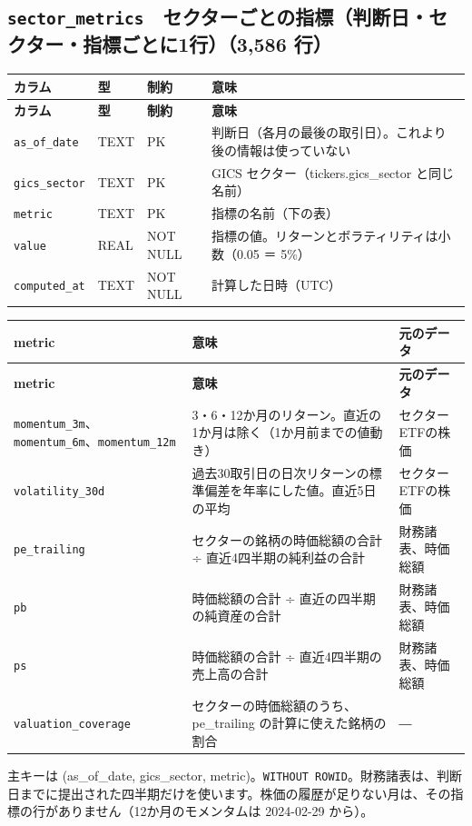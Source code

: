\documentclass[xelatex,ja=standard,jafont=hiragino-pron,a4paper,10pt]{bxjsreport}
\begin{document}
\subsection*{\texttt{sector\_\allowbreak{}metrics}　セクターごとの指標（判断日・セクター・指標ごとに1行）（3,586 行）}
{\footnotesize
\begin{longtable}{p{3.30cm}p{1.40cm}p{3.00cm}p{6.40cm}}
\toprule
\textbf{カラム} & \textbf{型} & \textbf{制約} & \textbf{意味} \\
\midrule
\endfirsthead
\toprule
\textbf{カラム} & \textbf{型} & \textbf{制約} & \textbf{意味} \\
\midrule
\endhead
\bottomrule
\endfoot
\texttt{as\_\allowbreak{}of\_\allowbreak{}date} & TEXT & PK & 判断日（各月の最後の取引日）。これより後の情報は使っていない \\
\texttt{gics\_\allowbreak{}sector} & TEXT & PK & GICS セクター（tickers.gics\_sector と同じ名前） \\
\texttt{metric} & TEXT & PK & 指標の名前（下の表） \\
\texttt{value} & REAL & NOT NULL & 指標の値。リターンとボラティリティは小数（0.05 ＝ 5\%） \\
\texttt{computed\_\allowbreak{}at} & TEXT & NOT NULL & 計算した日時（UTC） \\
\end{longtable}
}
{\footnotesize
\begin{longtable}{p{4.60cm}p{6.60cm}p{3.10cm}}
\toprule
\textbf{metric} & \textbf{意味} & \textbf{元のデータ} \\
\midrule
\endfirsthead
\toprule
\textbf{metric} & \textbf{意味} & \textbf{元のデータ} \\
\midrule
\endhead
\bottomrule
\endfoot
\texttt{momentum\_\allowbreak{}3m}、\texttt{momentum\_\allowbreak{}6m}、\texttt{momentum\_\allowbreak{}12m} & 3・6・12か月のリターン。直近の1か月は除く（1か月前までの値動き） & セクターETFの株価 \\
\texttt{volatility\_\allowbreak{}30d} & 過去30取引日の日次リターンの標準偏差を年率にした値。直近5日の平均 & セクターETFの株価 \\
\texttt{pe\_\allowbreak{}trailing} & セクターの銘柄の時価総額の合計 ÷ 直近4四半期の純利益の合計 & 財務諸表、時価総額 \\
\texttt{pb} & 時価総額の合計 ÷ 直近の四半期の純資産の合計 & 財務諸表、時価総額 \\
\texttt{ps} & 時価総額の合計 ÷ 直近4四半期の売上高の合計 & 財務諸表、時価総額 \\
\texttt{valuation\_\allowbreak{}coverage} & セクターの時価総額のうち、pe\_trailing の計算に使えた銘柄の割合 & ― \\
\end{longtable}
}
{\small 主キーは (as\_of\_date, gics\_sector, metric)。\texttt{WITHOUT ROWID}。財務諸表は、判断日までに提出された四半期だけを使います。株価の履歴が足りない月は、その指標の行がありません（12か月のモメンタムは 2024-02-29 から）。\par}
\medskip
\end{document}
